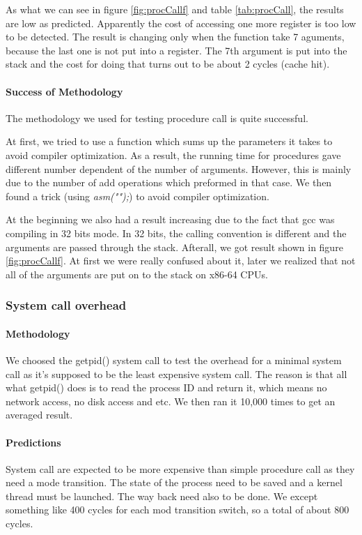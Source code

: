 As what we can see in figure \ref{fig:procCallf} and table \ref{tab:procCall}, the results are low as predicted.
Apparently the cost of accessing one more register is too low to be detected.
The result is changing only when the function take 7 aguments, because the last
one is not put into a register.
The 7th argument is put into the stack and the cost for doing that turns out to
be about 2 cycles (cache hit).

\paragraph{Success of Methodology}
The methodology we used for testing procedure call is quite successful.

At first, we tried to use a function which sums up the parameters it takes to
avoid compiler optimization.
As a result, the running time for procedures gave different number dependent of
the number of arguments.
However, this is mainly due to the number of add operations which preformed in that case.
We then found a trick (using \emph{asm("");}) to avoid compiler optimization.

At the beginning we also had a result increasing due to the fact that gcc was
compiling in 32 bits mode.
In 32 bits, the calling convention is different and the arguments are passed
through the stack.
Afterall, we got result shown in figure \ref{fig:procCallf}.
At first we were really confused about it, later we realized that not all of
the arguments are put on to the stack on x86-64 CPUs.




\subsubsection{System call overhead}
\paragraph{Methodology}
We choosed the getpid() system call to test the overhead for a minimal system
call as it's supposed to be the least expensive system call. The reason is that all what getpid() does is to read the process ID and return it, which means no network access, no disk access and etc.
We then ran it 10,000 times to get an averaged result.



\paragraph{Predictions}
System call are expected to be more expensive than simple procedure call as they
need a mode transition.
The state of the process need to be saved and a kernel thread must be launched.
The way back need also to be done.
We except something like 400 cycles for each mod transition switch, so a total of about 800 cycles.

